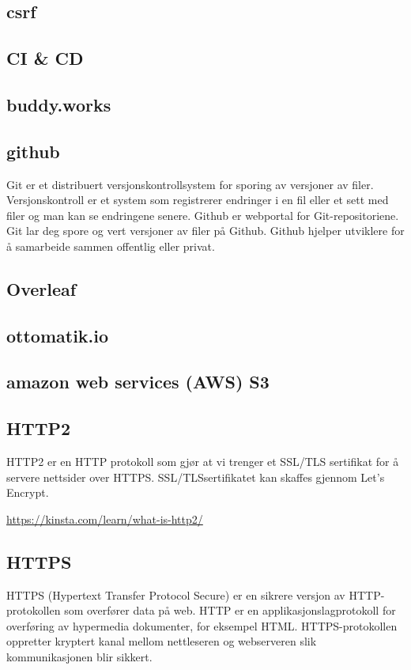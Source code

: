 \subsection{csrf}
\subsection{CI \& CD}
\subsection{buddy.works}
\subsection{github}
 Git er et distribuert versjonskontrollsystem for sporing av versjoner av filer. Versjonskontroll er et system som registrerer endringer i en fil eller et sett med filer og man kan se endringene senere. Github er webportal for Git-repositoriene. Git lar deg spore og vert versjoner av filer på Github. Github hjelper utviklere for å samarbeide sammen offentlig eller privat.
 
\subsection{Overleaf}
\subsection{ottomatik.io}

\subsection{amazon web services (AWS) S3}
\subsection{HTTP2}
HTTP2 er en HTTP protokoll som gjør at vi trenger et SSL/TLS sertifikat for å servere nettsider over HTTPS. SSL/TLSsertifikatet kan skaffes gjennom Let’s Encrypt.  

\url{https://kinsta.com/learn/what-is-http2/}

\subsection{HTTPS}
HTTPS (Hypertext Transfer Protocol Secure) er en sikrere versjon av HTTP-protokollen som overfører data på web. HTTP er en applikasjonslagprotokoll for overføring av hypermedia dokumenter, for eksempel HTML. HTTPS-protokollen oppretter kryptert kanal mellom nettleseren og webserveren slik  kommunikasjonen blir sikkert. 

